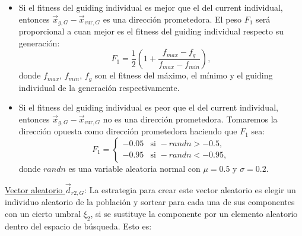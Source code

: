 \documentclass{article}
\begin{document}
\begin{itemize}
    \item Si el fitness del guiding individual es mejor que el del current individual, entonces $\vec{x}_{g,G}-\vec{x}_{\text{cur}, G}$ es una dirección prometedora. El peso $F_{1}$ será proporcional a cuan mejor es el fitness del guiding individual respecto su generación:
\begin{equation}
	F_{1}=\dfrac{1}{2}\left(1+\dfrac{f_{max}-f_{g}}{f_{max}-f_{min}}\right),
	\label{F1_Pos}
\end{equation}
donde $f_{max}$, $f_{min}$, $f_{g}$ son el fitness del máximo, el mínimo y el guiding individual de la generación respectivamente.
    \item Si el fitness del guiding individual es peor que el del current individual, entonces $\vec{x}_{g,G}-\vec{x}_{\text{cur}, G}$ no es una dirección prometedora. Tomaremos la dirección opuesta como dirección prometedora haciendo que $F_{1}$ sea:
\begin{equation}
    F_{1} = \left\{\begin{array}{ll}
            -0.05 & \text{si }-randn>-0.5,\\
            -0.95 & \text{si }-randn<-0.95,
    \end{array}\right.
\label{F1_neg}
\end{equation}
donde $randn$ es una variable aleatoria normal con $\mu=0.5$ y $\sigma=0.2$.
\end{itemize}

\underline{Vector aleatorio $\vec{d}_{r2,G}$}: La estrategia para crear este vector aleatorio es elegir un individuo aleatorio de la población y sortear para cada una de sus componentes con un cierto umbral $\xi_2$, si se sustituye la componente por un elemento aleatorio dentro del espacio de búsqueda. Esto es:
\end{document}
